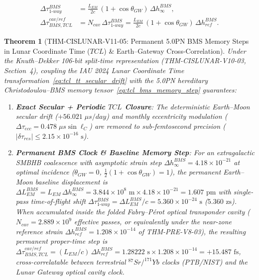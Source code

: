 \documentclass[11pt,a4paper,reqno]{article}
\def\bm#1{#1}%
\def\texttt#1{#1}%
\def\mathrm#1{#1}%
\def\mathbb#1{#1}%
\theoremstyle{plain}
\newtheorem{theorem}{Theorem}[section]
\theoremstyle{definition}
\theoremstyle{remark}
\numberwithin{equation}{section}
\begin{document}
\begin{equation}
\begin{aligned}
  \Delta\tau_{\mathrm{1\text{-}way}}^{\mathrm{BMS}} &= \frac{L_{\mathrm{EM}}}{2c}\,(1 + \cos\theta_{\mathrm{GW}})\,\Delta h_{\infty}^{\mathrm{BMS}}, \\
  \Delta\tau_{\mathrm{BMS,TCL}}^{\mathrm{cav/ref}} &= N_{\mathrm{cav}}\,\Delta\tau_{\mathrm{1\text{-}way}}^{\mathrm{BMS}} = \frac{L_{\mathrm{EM}}}{2c}\,(1 + \cos\theta_{\mathrm{GW}})\,\Delta h_{\mathrm{ref}}^{\mathrm{BMS}}.
\end{aligned}
  \label{eq:tcl_bms_memory_step}
\end{equation}

\begin{theorem}[\texttt{THM-CISLUNAR-V11-05}: Permanent 5.0PN BMS Memory Steps in Lunar Coordinate Time ($\mathrm{TCL}$) \& Earth--Gateway Cross-Correlation]
\label{thm:cislunar_v11_tcl_bms}
Under the Knuth--Dekker 106-bit split-time representation (\texttt{THM-CISLUNAR-V10-03}, Section~4), coupling the IAU 2024 Lunar Coordinate Time transformation~\eqref{eq:tcl_tt_secular_drift} with the 5.0PN hereditary Christodoulou--BMS memory tensor~\eqref{eq:tcl_bms_memory_step} guarantees:
\begin{enumerate}[label=(\roman*),leftmargin=2.2em,itemsep=2pt]
  \item \textbf{Exact Secular + Periodic $\mathrm{TCL}$ Closure}: The deterministic Earth--Moon secular drift ($+56.021\;\mu\mathrm{s/day}$) and monthly eccentricity modulation ($\Delta\tau_{\mathrm{ecc}} = 0.478\;\mu\mathrm{s}\sin\ell_{\mathbb{C}}$) are removed to sub-femtosecond precision ($|\delta\tau_{\mathrm{res}}| \le \bm{2.15 \times 10^{-16}\text{ s}}$).
  \item \textbf{Permanent BMS Clock \& Baseline Memory Step}: For an extragalactic SMBHB coalescence with asymptotic strain step $\Delta h_\infty^{\mathrm{BMS}} = 4.18 \times 10^{-21}$ at optimal incidence ($\theta_{\mathrm{GW}} = 0$, $\frac{1}{2}(1+\cos\theta_{\mathrm{GW}}) = 1$), the permanent Earth--Moon baseline displacement is $\Delta L_{\mathrm{EM}}^{\mathrm{BMS}} = L_{\mathrm{EM}}\,\Delta h_\infty^{\mathrm{BMS}} = 3.844 \times 10^8\text{ m} \times 4.18 \times 10^{-21} = \bm{1.607\text{ pm}}$ with single-pass time-of-flight shift $\Delta\tau_{\mathrm{1\text{-}way}}^{\mathrm{BMS}} = \Delta L_{\mathrm{EM}}^{\mathrm{BMS}} / c = \bm{5.360 \times 10^{-24}\text{ s}}$ ($5.360\text{ zs}$). When accumulated inside the folded Fabry--P\'erot optical transponder cavity ($N_{\mathrm{cav}} = 2.889 \times 10^9$ effective passes, or equivalently under the near-zone reference strain $\Delta h_{\mathrm{ref}}^{\mathrm{BMS}} = 1.208 \times 10^{-14}$ of \texttt{THM-PRE-V8-03}), the resulting permanent proper-time step is $\Delta\tau_{\mathrm{BMS,TCL}}^{\mathrm{cav/ref}} = (L_{\mathrm{EM}}/c)\,\Delta h_{\mathrm{ref}}^{\mathrm{BMS}} = 1.28222\text{ s} \times 1.208 \times 10^{-14} = \bm{+15.487\text{ fs}}$, cross-correlatable between terrestrial $^{87}\mathrm{Sr}/^{171}\mathrm{Yb}$ clocks (PTB/NIST) and the Lunar Gateway optical cavity clock.
\end{enumerate}
\end{theorem}
\end{document}
